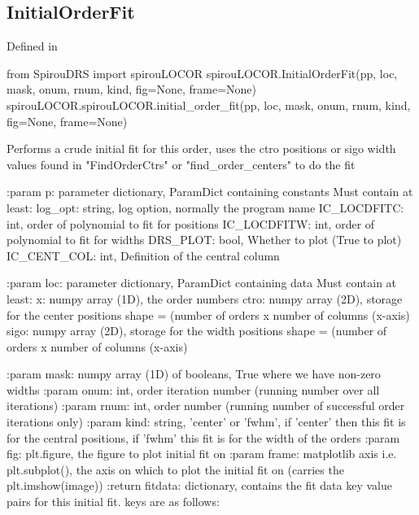 \begin{minipage}{\textwidth}
\subsection{InitialOrderFit}

Defined in \spirouLOCOR{}

\begin{pythonbox}
from SpirouDRS import spirouLOCOR
spirouLOCOR.InitialOrderFit(pp, loc, mask, onum, rnum, kind, fig=None, frame=None)
spirouLOCOR.spirouLOCOR.initial_order_fit(pp, loc, mask, onum, rnum, kind, fig=None, frame=None)
\end{pythonbox}

\begin{pythondocstring}
Performs a crude initial fit for this order, uses the ctro positions or sigo 
width values found in "FindOrderCtrs" or "find_order_centers" to do the fit

:param p: parameter dictionary, ParamDict containing constants
    Must contain at least:
            log_opt: string, log option, normally the program name
            IC_LOCDFITC: int, order of polynomial to fit for positions
            IC_LOCDFITW: int, order of polynomial to fit for widths
            DRS_PLOT: bool, Whether to plot (True to plot)
            IC_CENT_COL: int, Definition of the central column

:param loc: parameter dictionary, ParamDict containing data
        Must contain at least:
            x: numpy array (1D), the order numbers
            ctro: numpy array (2D), storage for the center positions
                  shape = (number of orders x number of columns (x-axis)
            sigo: numpy array (2D), storage for the width positions
                  shape = (number of orders x number of columns (x-axis)

:param mask: numpy array (1D) of booleans, True where we have non-zero
             widths
:param onum: int, order iteration number (running number over all
             iterations)
:param rnum: int, order number (running number of successful order
             iterations only)
:param kind: string, 'center' or 'fwhm', if 'center' then this fit is for
             the central positions, if 'fwhm' this fit is for the width of
             the orders
:param fig: plt.figure, the figure to plot initial fit on
:param frame: matplotlib axis i.e. plt.subplot(), the axis on which to plot
              the initial fit on (carries the plt.imshow(image))
:return fitdata: dictionary, contains the fit data key value pairs for this
                 initial fit. keys are as follows:


\end{pythondocstring}
\end{minipage}
